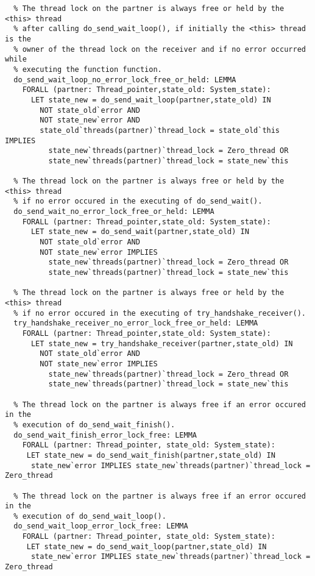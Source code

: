\begin{lstlisting}
  % The thread lock on the partner is always free or held by the <this> thread
  % after calling do_send_wait_loop(), if initially the <this> thread is the
  % owner of the thread lock on the receiver and if no error occurred while
  % executing the function function.
  do_send_wait_loop_no_error_lock_free_or_held: LEMMA
    FORALL (partner: Thread_pointer,state_old: System_state):
      LET state_new = do_send_wait_loop(partner,state_old) IN
        NOT state_old`error AND 
        NOT state_new`error AND
        state_old`threads(partner)`thread_lock = state_old`this IMPLIES
          state_new`threads(partner)`thread_lock = Zero_thread OR
          state_new`threads(partner)`thread_lock = state_new`this

  % The thread lock on the partner is always free or held by the <this> thread
  % if no error occured in the executing of do_send_wait().
  do_send_wait_no_error_lock_free_or_held: LEMMA
    FORALL (partner: Thread_pointer,state_old: System_state):
      LET state_new = do_send_wait(partner,state_old) IN
        NOT state_old`error AND 
        NOT state_new`error IMPLIES
          state_new`threads(partner)`thread_lock = Zero_thread OR
          state_new`threads(partner)`thread_lock = state_new`this

  % The thread lock on the partner is always free or held by the <this> thread
  % if no error occured in the executing of try_handshake_receiver().
  try_handshake_receiver_no_error_lock_free_or_held: LEMMA
    FORALL (partner: Thread_pointer,state_old: System_state):
      LET state_new = try_handshake_receiver(partner,state_old) IN
        NOT state_old`error AND 
        NOT state_new`error IMPLIES
          state_new`threads(partner)`thread_lock = Zero_thread OR
          state_new`threads(partner)`thread_lock = state_new`this
  
  % The thread lock on the partner is always free if an error occured in the 
  % execution of do_send_wait_finish().
  do_send_wait_finish_error_lock_free: LEMMA
    FORALL (partner: Thread_pointer, state_old: System_state):
     LET state_new = do_send_wait_finish(partner,state_old) IN
      state_new`error IMPLIES state_new`threads(partner)`thread_lock = Zero_thread

  % The thread lock on the partner is always free if an error occured in the 
  % execution of do_send_wait_loop().
  do_send_wait_loop_error_lock_free: LEMMA
    FORALL (partner: Thread_pointer, state_old: System_state):
     LET state_new = do_send_wait_loop(partner,state_old) IN
      state_new`error IMPLIES state_new`threads(partner)`thread_lock = Zero_thread


\end{lstlisting}
